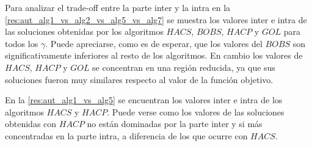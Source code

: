 \begin{table}[H]
\begin{center}
\caption{Comparación de calidad de soluciones entre algoritmos para la \hyperref[busqueda:autores]{búsqueda de autores}} 
\end{center}
\end{table}

Para analizar el trade-off entre la parte inter y la intra en la \autoref{res:aut_alg1_vs_alg2_vs_alg5_vs_alg7} se muestra los valores inter e intra de las soluciones obtenidas por los algoritmos $HACS$, $BOBS$, $HACP$ y $GOL$ para todos los $\gamma$. Puede apreciarse, como es de esperar, que los valores del $BOBS$ son significativamente inferiores al resto de los algoritmos. En cambio los valores de $HACS$, $HACP$ y $GOL$ se concentran en una región reducida, ya que sus soluciones fueron muy similares respecto al valor de la función objetivo.

En la \autoref{res:aut_alg1_vs_alg5} se encuentran los valores inter e intra de los algoritmos $HACS$ y $HACP$. Puede verse como los valores de las soluciones obtenidas con $HACP$ no están dominadas por la parte inter y si más concentradas en la parte intra, a diferencia de los que ocurre con $HACS$.

